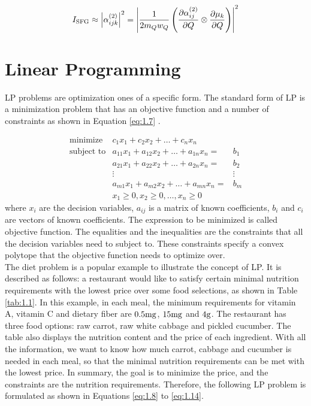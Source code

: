 \begin{equation} \label{eq:1.6}
I_{\rm SFG} \approx \left| \alpha^{(2)}_{ijk} \right|^{2}
= \left| \frac{1}{2m_{Q}w_{Q}} \left( \frac{\partial\alpha^{(2)}_{ij}}{\partial Q} \otimes \frac{\partial\mu_{k}}{\partial Q} \right) \right|^{2}
\end{equation}

\section{Linear Programming \cite{UULP}}
LP problems are optimization ones of a specific form. The standard form of LP is a minimization problem that has an objective function and a number of constraints as shown in Equation \ref{eq:1.7} \cite{LPTA}.

\begin{eqnarray}  \label{eq:1.7}
 \text{minimize} & c_{1}x_{1} + c_{2}x_{2} + \dots + c_{n} x_{n}  \nonumber \\
 \text{subject to} & a_{11} x_{1} + a_{12} x_{2}+ \dots + a_{1n} x_{n} = & b_{1} \nonumber \\
& a_{21} x_{1} + a_{22} x_{2} + \dots + a_{2n} x_{n} = & b_{2} \nonumber \\
&\vdots                                   &\vdots \nonumber \\
& a_{m1} x_{1} + a_{m2} x_{2} + \dots + a_{mn} x_{n} = & b_{m} \nonumber \\
& x_{1} \geq 0, x_{2} \geq 0, \dots ,x_{n} \geq 0
\end{eqnarray} 
where $x_{i}$ are the decision variables, $a_{ij}$ is a matrix of known coefficients, $b_{i}$ and $c_{i}$ are vectors of known coefficients. The expression to be minimized is called objective function. The equalities and the inequalities are the constraints that all the decision variables need to subject to. These constraints specify a convex polytope that the objective function needs to optimize over. \\ 

The diet problem is a popular example to illustrate the concept of LP. It is described as follows: a restaurant would like to satisfy certain minimal nutrition requirements with the lowest price over some food selections, as shown in Table \ref{tab:1.1}. In this example, in each meal, the minimum requirements for vitamin A, vitamin C and dietary fiber are $0.5 \rm mg$, $15 \rm mg$ and $4 \rm g$. The restaurant has three food options: raw carrot, raw white cabbage and pickled cucumber. The table also displays the nutrition content and the price of each ingredient. With all the information, we want to know how much carrot, cabbage and cucumber is needed in each meal, so that the minimal nutrition requirements can be met with the lowest price. In summary, the goal is to minimize the price, and the constraints are the nutrition requirements. Therefore, the following LP problem is formulated as shown in Equations \ref{eq:1.8} to \ref{eq:1.14}.

